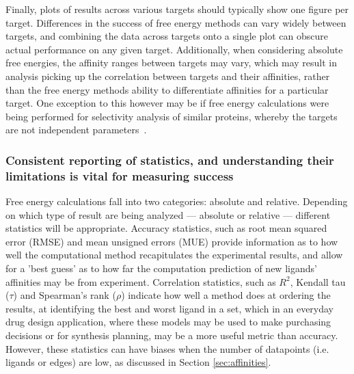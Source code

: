 \documentclass[9pt,bestpractices]{livecoms}
\begin{document}
Finally, plots of results across various targets should typically show one figure per target. Differences in the success of free energy methods can vary widely between targets, and combining the data across targets onto a single plot can obscure actual performance on any given target. Additionally, when considering absolute free energies, the affinity ranges between targets may vary, which may result in analysis picking up the correlation between targets and their affinities, rather than the free energy methods ability to differentiate affinities for a particular target. One exception to this however may be if free energy calculations were being performed for selectivity analysis of similar proteins, whereby the targets are not independent parameters~\cite{aldeghiPredictionsLigandSelectivity2017}.

\subsubsection{Consistent reporting of statistics, and understanding their limitations is vital for measuring success}
\label{sec:statistical_analysis}
Free energy calculations fall into two categories: absolute and relative. Depending on which type of result are being analyzed --- absolute or relative --- different statistics will be appropriate. Accuracy statistics, such as root mean squared error (RMSE) and mean unsigned errors (MUE) provide information as to how well the computational method recapitulates the experimental results, and allow for a 'best guess' as to how far the computation prediction of new ligands' affinities may be from experiment. Correlation statistics, such as $R^{2}$, Kendall tau ($\tau$) and Spearman's rank ($\rho$) indicate how well a method does at ordering the results, at identifying the best and worst ligand in a set, which in an everyday drug design application, where these models may be used to make purchasing decisions or for synthesis planning, may be a more useful metric than accuracy. However, these statistics can have biases when the number of datapoints (i.e. ligands or edges) are low, as discussed in Section \ref{sec:affinities}.
\end{document}
